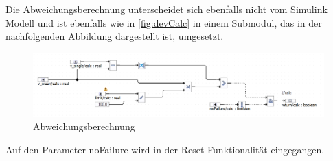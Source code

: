 Die Abweichungsberechnung unterscheidet sich ebenfalls nicht vom Simulink Modell und ist ebenfalls wie in \autoref{fig:devCalc} in einem Submodul, das in der nachfolgenden Abbildung dargestellt ist, umgesetzt.
\begin{figure}[H]
	\centering
	\includegraphics[width=\linewidth]{../Graphiken/devCalc}
	\caption{Abweichungsberechnung}
	\label{fig:devCalc}
\end{figure}
Auf den Parameter noFailure wird in der Reset Funktionalität eingegangen.






